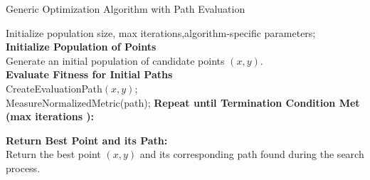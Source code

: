 \begin{algorithm}[H]
    \caption{Generic Optimization Algorithm with Path Evaluation}\label{optimization}
    
    
    Initialize  
    population size, max iterations,algorithm-specific parameters;\\
    \textbf{Initialize Population of Points}\\
    Generate an initial population of candidate points $(x, y)$.\\

    \textbf{Evaluate Fitness for Initial Paths}\\
    CreateEvaluationPath$(x, y)$;\\
    MeasureNormalizedMetric(path);    
    \textbf{Repeat until Termination Condition Met (max iterations ):}\\
    
    \textbf{Return Best Point and its Path:}\\
    Return the best point $(x, y)$ and its corresponding path found during the search process.
    \end{algorithm}

    
\begin{table}[ht]
    \centering
    \caption{Comparison of Planning Time for Different Algorithms in Simple and Complicated Environments (in milliseconds)}
\end{table}


